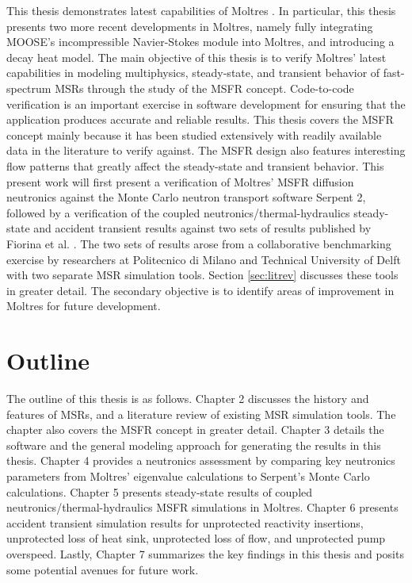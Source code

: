 This thesis demonstrates latest capabilities of Moltres
\cite{lindsay_introduction_2018}.
In particular, this thesis presents two more recent
developments in Moltres, namely fully integrating \gls{MOOSE}'s incompressible
Navier-Stokes module into Moltres, and introducing a
decay heat model.
The main objective of this thesis is to verify Moltres'
latest capabilities in modeling multiphysics, steady-state, and transient
behavior of fast-spectrum \glspl{MSR} through the study of the \gls{MSFR}
concept. Code-to-code verification is an important exercise in software
development for ensuring that the application produces accurate and reliable
results. This thesis covers the \gls{MSFR} concept mainly because it has been
studied extensively with readily available data in the literature to verify
against. The \gls{MSFR} design also features interesting flow
patterns that greatly affect the steady-state and transient behavior. This
present work will first present a verification of Moltres' \gls{MSFR}
diffusion neutronics against the Monte Carlo neutron transport software
Serpent 2, followed by a verification of
the coupled neutronics/thermal-hydraulics steady-state and accident transient
results against two sets of results published by
Fiorina et al. \cite{fiorina_modelling_2014}. The two sets of results arose
from a collaborative benchmarking exercise by researchers at Politecnico di
Milano and Technical University of Delft with two separate \gls{MSR}
simulation tools. Section \ref{sec:litrev} discusses these tools
in greater detail. The
secondary objective is to identify areas of improvement in Moltres for future
development.

\section{Outline}

The outline of this thesis is as follows. Chapter 2 discusses the history and
features of \glspl{MSR}, and a literature review of existing \gls{MSR}
simulation tools. The chapter also covers the \gls{MSFR} concept in greater
detail. Chapter 3 details the software and the general modeling
approach for generating the results in this thesis. Chapter 4 provides a
neutronics assessment by comparing key neutronics parameters from Moltres'
eigenvalue calculations to Serpent's Monte Carlo calculations. Chapter 5
presents steady-state results of coupled neutronics/thermal-hydraulics
\gls{MSFR} simulations in Moltres. Chapter 6 presents accident transient
simulation results for unprotected reactivity insertions, unprotected loss of
heat sink, unprotected loss of flow, and unprotected pump overspeed. Lastly,
Chapter 7 summarizes the key findings in this thesis
and posits some potential avenues for future work.
